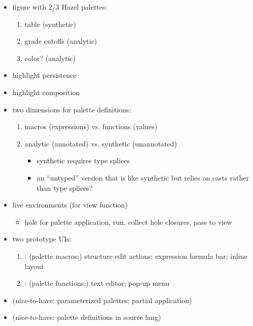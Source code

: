 \begin{itemize}

\item figure with 2/3 Hazel palettes:

  \begin{enumerate}
    \item table (synthetic)
    \item grade cutoffs (analytic)
    \item color? (analytic)
  \end{enumerate}

\item highlight persistence

\item highlight composition

\item two dimensions for palette definitions:

  \begin{enumerate}
    \item macros (expressions) vs. functions (values)
    \item analytic (annotated) vs. synthetic (unannotated)
      \begin{itemize}
        \item synthetic requires type splices
        \item an ``untyped'' version that is like synthetic but relies on casts rather than type splices?
      \end{itemize}
  \end{enumerate}

\item live environments (for view function)

  \begin{itemize}
    \item hole for palette application, run, collect hole closures, pass to view
  \end{itemize}

\item two prototype UIs:

  \begin{enumerate}
    \item \Hazel{}: (palette macros;) structure edit actions; expression formula bar; inline layout
    \item \sns{}: (palette functions;) text editor; pop-up menu
  \end{enumerate}

\item (nice-to-have: parameterized palettes; partial application)

\item (nice-to-have: palette definitions in source lang)

\end{itemize}
